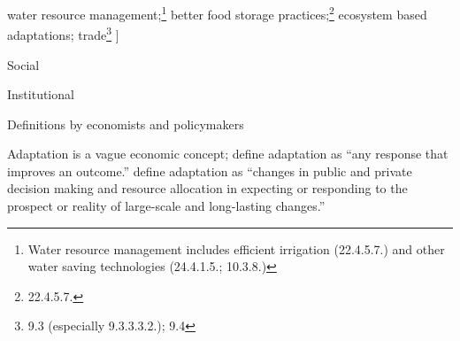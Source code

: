 \documentclass[10 pt]{article}
\begin{document}
\begin{outline}
\begin{blist}
{				%
			water resource management;\footnote{
				Water resource management includes efficient irrigation (22.4.5.7.) and other water saving technologies (24.4.1.5.; 10.3.8.)
			}
			better food storage practices;\footnote{22.4.5.7.}
			ecosystem based adaptations;
			trade\footnote{9.3 (especially 9.3.3.3.2.); 9.4}
			]}
		\item Social 
		\item Institutional 
	\end{blist}
	
	

\item Definitions by economists and policymakers

\begin{blist}


\item Adaptation is a vague economic concept; \textcite{BL10} define adaptation as ``any response that improves an outcome.''
\textcite{ZZH12} define adaptation as ``changes in public and private decision making and resource allocation in expecting or responding to the prospect or reality of large-scale and long-lasting changes.''


\end{blist}
\end{outline}
\end{document}

